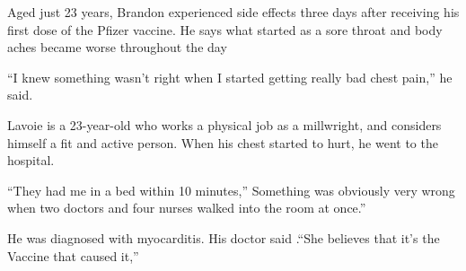 Aged just 23 years, Brandon experienced side effects three days after receiving
his first dose of the Pfizer vaccine. He says what started as a sore throat and
body aches became worse throughout the day

“I knew something wasn’t right when I started getting really bad chest pain,” he
said.

Lavoie is a 23-year-old who works a physical job as a millwright, and considers
himself a fit and active person. When his chest started to hurt, he went to the
hospital.

“They had me in a bed within 10 minutes,” Something was obviously very wrong
when two doctors and four nurses walked into the room at once.”

He was diagnosed with myocarditis. His doctor said .“She believes that it’s the
Vaccine that caused it,”

